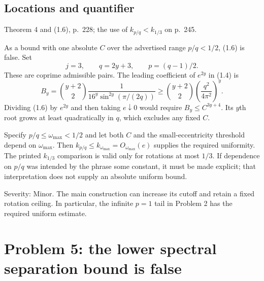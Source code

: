 \documentclass[10pt]{article}
\begin{document}
\subsection*{Locations and quantifier}
Theorem 4 and (1.6), p. 228; the use of \(k_{p/q}<k_{1/3}\) on p. 245.\par
As a bound with one absolute \(C\) over the advertised range \(p/q<1/2\), (1.6) is false. Set \[j=3,\qquad q=2y+3,\qquad p=(q-1)/2.\] These are coprime admissible pairs. The leading coefficient of \(e^{2y}\) in (1.4) is \[B_y=\binom{y+2}{2}
       \frac1{16^y\sin^{2y}(\pi/(2q))}
 \geq\binom{y+2}{2}\left(\frac{q^2}{4\pi^2}\right)^y.\] Dividing (1.6) by \(e^{2y}\) and then taking \(e\downarrow0\) would require \(B_y\leq C^{3y+4}\). Its \(y\)th root grows at least quadratically in \(q\), which excludes any fixed \(C\).\par
Specify \(p/q\leq\omega_{\max}<1/2\) and let both \(C\) and the small-eccentricity threshold depend on \(\omega_{\max}\). Then \(k_{p/q}\leq k_{\omega_{\max}}=O_{\omega_{\max}}(e)\) supplies the required uniformity. The printed \(k_{1/3}\) comparison is valid only for rotations at most \(1/3\). If dependence on \(p/q\) was intended by the phrase some constant, it must be made explicit; that interpretation does not supply an absolute uniform bound.\par
Severity: Minor. The main construction can increase its cutoff and retain a fixed rotation ceiling. In particular, the infinite \(p=1\) tail in Problem 2 has the required uniform estimate.\par
\section*{Problem 5: the lower spectral separation bound is false}
\end{document}
